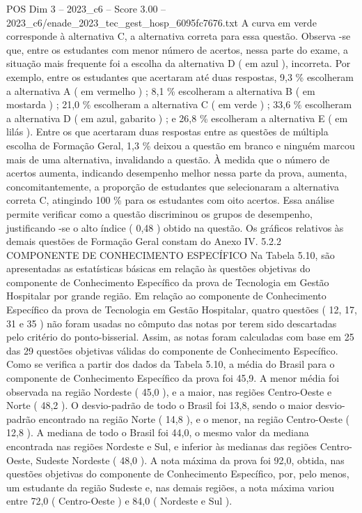 \begin{textsample}{POS Dim 3 – 2023\_c6 – Score 3.00 – 2023\_c6/enade\_2023\_tec\_gest\_hosp\_6095fc7676.txt}
A curva em verde corresponde à alternativa C, a alternativa correta para essa questão.
Observa -se que, entre os estudantes com menor número de acertos, nessa parte do exame, a situação mais frequente foi a escolha da alternativa D ( em azul ), incorreta.
Por exemplo, entre os estudantes que acertaram até duas respostas, 9,3 \% escolheram a alternativa A ( em vermelho ) ; 8,1 \% escolheram a alternativa B ( em mostarda ) ; 21,0 \% escolheram a alternativa C ( em verde ) ; 33,6 \% escolheram a alternativa D ( em azul, gabarito ) ; e 26,8 \% escolheram a alternativa E ( em lilás ).
Entre os que acertaram duas respostas entre as questões de múltipla escolha de Formação Geral, 1,3 \% deixou a questão em branco e ninguém marcou mais de uma alternativa, invalidando a questão.
À medida que o número de acertos aumenta, indicando desempenho melhor nessa parte da prova, aumenta, concomitantemente, a proporção de estudantes que selecionaram a alternativa correta C, atingindo 100 \% para os estudantes com oito acertos.
Essa análise permite verificar como a questão discriminou os grupos de desempenho, justificando -se o alto índice ( 0,48 ) obtido na questão.
Os gráficos relativos às demais questões de Formação Geral constam do Anexo IV. 5.2.2 COMPONENTE DE CONHECIMENTO ESPECÍFICO Na Tabela 5.10, são apresentadas as estatísticas básicas em relação às questões objetivas do componente de Conhecimento Específico da prova de Tecnologia em Gestão Hospitalar por grande região.
Em relação ao componente de Conhecimento Específico da prova de Tecnologia em Gestão Hospitalar, quatro questões ( 12, 17, 31 e 35 ) não foram usadas no cômputo das notas por terem sido descartadas pelo critério do ponto-bisserial.
Assim, as notas foram calculadas com base em 25 das 29 questões objetivas válidas do componente de Conhecimento Específico.
Como se verifica a partir dos dados da Tabela 5.10, a média do Brasil para o componente de Conhecimento Específico da prova foi 45,9.
A menor média foi observada na região Nordeste ( 45,0 ), e a maior, nas regiões Centro-Oeste e Norte ( 48,2 ).
O desvio-padrão de todo o Brasil foi 13,8, sendo o maior desvio-padrão encontrado na região Norte ( 14,8 ), e o menor, na região Centro-Oeste ( 12,8 ).
A mediana de todo o Brasil foi 44,0, o mesmo valor da mediana encontrada nas regiões Nordeste e Sul, e inferior às medianas das regiões Centro-Oeste, Sudeste Nordeste ( 48,0 ).
A nota máxima da prova foi 92,0, obtida, nas questões objetivas do componente de Conhecimento Específico, por, pelo menos, um estudante da região Sudeste e, nas demais regiões, a nota máxima variou entre 72,0 ( Centro-Oeste ) e 84,0 ( Nordeste e Sul ).

\end{textsample}
